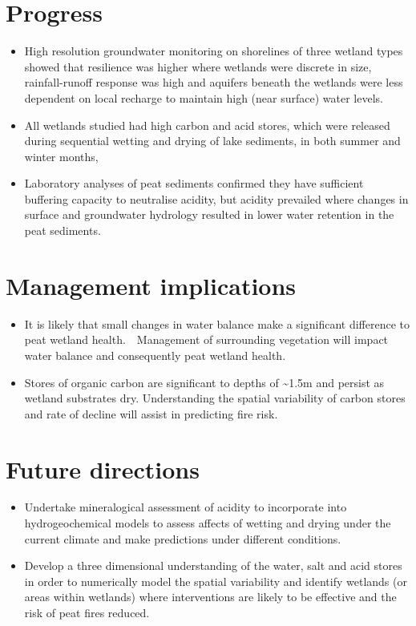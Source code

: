 \documentclass[version=last,
    paper=a4, %
    10pt, %
    usenames,
    dvipsnames,
    oneside, %
    headings=openany, %
    DIV=15 %
]{scrbook}
\begin{document}
\section*{Progress}
\begin{itemize}
\itemsep1pt\parskip0pt
\item
  High resolution groundwater monitoring on shorelines of three wetland
  types showed that resilience was higher where wetlands were discrete
  in size, rainfall-runoff response was high and aquifers beneath the
  wetlands were less dependent on local recharge to maintain high (near
  surface) water levels.
\item
  All wetlands studied had high carbon and acid stores, which were
  released during sequential wetting and drying of lake sediments, in
  both summer and winter months,~
\item
  Laboratory analyses of peat sediments confirmed they have sufficient
  buffering capacity to neutralise acidity, but acidity prevailed where
  changes in surface and groundwater hydrology resulted in lower water
  retention in the peat sediments.~
\end{itemize}



\section*{Management implications}
\begin{itemize}
\itemsep1pt\parskip0pt
\item
  It is likely that small changes in water balance make a significant
  difference to peat wetland health.~~Management of surrounding
  vegetation will impact water balance and consequently peat wetland
  health.
\item
  Stores of organic carbon are significant to depths of
  \textasciitilde{}1.5m and persist as wetland substrates dry.
  Understanding the spatial variability of carbon stores and rate of
  decline will assist in predicting fire risk.
\end{itemize}



\section*{Future directions}
\begin{itemize}
\itemsep1pt\parskip0pt
\item
  Undertake mineralogical assessment of acidity to incorporate into
  hydrogeochemical models to assess affects of wetting and drying under
  the current climate and make predictions under different conditions.
\item
  Develop a three dimensional understanding of the water, salt and acid
  stores in order to numerically model the spatial variability and
  identify wetlands (or areas within wetlands) where interventions are
  likely to be effective and the risk of peat fires reduced.
\end{itemize}



\end{document}
